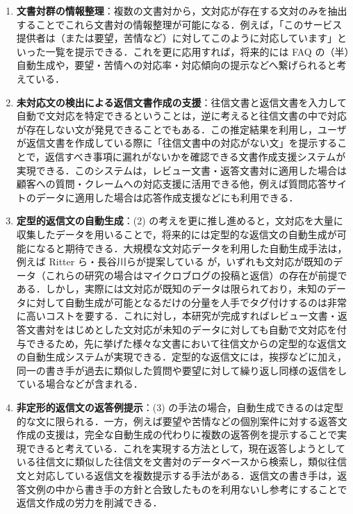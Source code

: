 \documentclass[japanese]{jnlp_1.4}
\begin{document}
\begin{enumerate}
\renewcommand{\labelenumi}{}
\item \textbf{文書対群の情報整理}：複数の文書対から，文対応が存在する文対のみを抽出することでこれら文書対の情報整理が可能になる．例えば，「このサービス提供者は（または要望，苦情など）に対してこのように対応しています」といった一覧を提示できる．これを更に応用すれば，将来的には FAQ の（半）自動生成や，要望・苦情への対応率・対応傾向の提示などへ繋げられると考えている．
\item \textbf{未対応文の検出による返信文書作成の支援}：往信文書と返信文書を入力して自動で文対応を特定できるということは，逆に考えると往信文書の中で対応が存在しない文が発見できることでもある．この推定結果を利用し，ユーザが返信文書を作成している際に「往信文書中の対応がない文」を提示することで，返信すべき事項に漏れがないかを確認できる文書作成支援システムが実現できる．このシステムは，レビュー文書・返答文書対に適用した場合は顧客への質問・クレームへの対応支援に活用できる他，例えば質問応答サイトのデータに適用した場合は応答作成支援などにも利用できる．
\item \textbf{定型的返信文の自動生成}：(2) の考えを更に推し進めると，文対応を大量に収集したデータを用いることで，将来的には定型的な返信文の自動生成が可能になると期待できる．大規模な文対応データを利用した自動生成手法は，例えば Ritter ら・長谷川らが提案している \cite{Ritter2011,長谷川貴之:2013}が，いずれも文対応が既知のデータ（これらの研究の場合はマイクロブログの投稿と返信）の存在が前提である．しかし，実際には文対応が既知のデータは限られており，未知のデータに対して自動生成が可能となるだけの分量を人手でタグ付けするのは非常に高いコストを要する．これに対し，本研究が完成すればレビュー文書・返答文書対をはじめとした文対応が未知のデータに対しても自動で文対応を付与できるため，先に挙げた様々な文書において往信文からの定型的な返信文の自動生成システムが実現できる．定型的な返信文には，挨拶などに加え，同一の書き手が過去に類似した質問や要望に対して繰り返し同様の返信をしている場合などが含まれる．
  \item \textbf{非定形的返信文の返答例提示}：(3) の手法の場合，自動生成できるのは定型的な文に限られる．一方，例えば要望や苦情などの個別案件に対する返答文作成の支援は，完全な自動生成の代わりに複数の返答例を提示することで実現できると考えている．これを実現する方法として，現在返答しようとしている往信文に類似した往信文を文書対のデータベースから検索し，類似往信文と対応している返信文を複数提示する手法がある．返信文の書き手は，返答文例の中から書き手の方針と合致したものを利用ないし参考にすることで返信文作成の労力を削減できる．
\end{enumerate}
\end{document}
